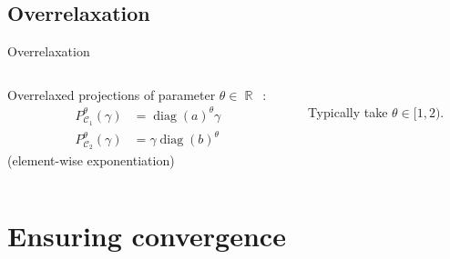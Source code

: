 \documentclass[compress]{beamer}
\DeclareMathOperator{\IR}{\mathbb{R}}
\DeclareMathOperator{\Ccal}{\mathcal{C}}
\DeclareMathOperator{\diag}{diag}
\begin{document}
\subsection{Overrelaxation}
\begin{frame}{Overrelaxation}
	\begin{columns}
		\begin{column}{0.6\textwidth}
			Overrelaxed projections of parameter $\theta \in \IR$~:
			\begin{align}\label{or_scaling}
			P_{\Ccal_1}^\theta(\gamma) &= \diag(a)^\theta \gamma\\
			P_{\Ccal_2}^\theta(\gamma) &= \gamma \diag(b)^\theta \nonumber
			\end{align}
			(element-wise exponentiation)
		\end{column}
		\begin{column}{0.4\textwidth}
			\centering
			\\
			Typically take $\theta \in [1,2)$.
		\end{column}
	\end{columns}
\end{frame}



\section{Ensuring convergence}

\end{document}
